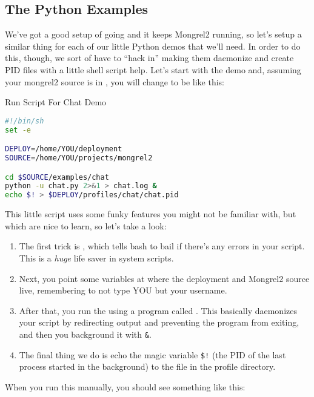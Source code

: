 \subsection{The Python Examples}

We've got a good setup of  going and it keeps Mongrel2
running, so let's setup a similar thing for each of our little
Python demos that we'll need.  In order to do this, though, we sort
of have to ``hack in'' making them daemonize and create PID files with
a little shell script help.  Let's start with the  demo
and, assuming your mongrel2 source is in ,
you will change  to be like this:

\begin{code}{Run Script For Chat Demo}
\begin{lstlisting}[language=sh]
#!/bin/sh
set -e

DEPLOY=/home/YOU/deployment
SOURCE=/home/YOU/projects/mongrel2

cd $SOURCE/examples/chat
python -u chat.py 2>&1 > chat.log &
echo $! > $DEPLOY/profiles/chat/chat.pid
\end{lstlisting}
\end{code}

This little script uses some funky features you might not be familiar
with, but which are nice to learn, so let's take a look:


\begin{enumerate}
\item The first trick is , which tells bash to bail if there's
    any errors in your script.  This is a \emph{huge} life saver in system
    scripts.
\item Next, you point some variables at where the deployment and Mongrel2 source
    live, remembering to not type YOU but your username.
\item After that, you run the  using a program called .
    This basically daemonizes your script by redirecting output and
    preventing the program from exiting, and then you background it with \verb|&|.
\item The final thing we do is echo the magic variable \verb|$!| (the PID of the
  last process started in the background) to the  file in the
  profile directory.
\end{enumerate}

When you run this manually, you should see something like this:

